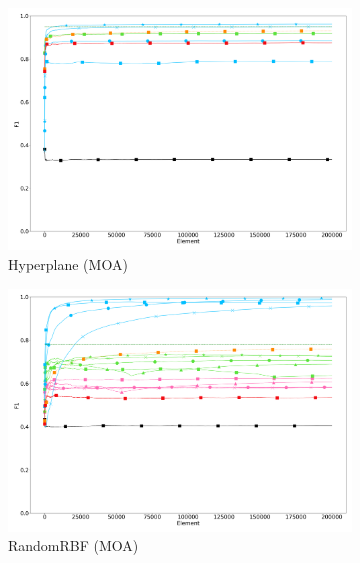 \begin{figure}
\begin{subfigure}[t]{.49\linewidth}
		\label{fig:f1-drift}
	\end{subfigure}\\
	\begin{subfigure}[t]{.49\linewidth}
		\includegraphics[width=\linewidth]{figures/results/dataset_1_f1.png}
		\caption{Hyperplane (MOA)}
		\label{fig:f1-dataset_1}
	\end{subfigure}
	\begin{subfigure}[t]{.49\linewidth}
		\includegraphics[width=\linewidth]{figures/results/dataset_2_f1.png}
		\caption{RandomRBF (MOA)}
		\label{fig:f1-dataset_2}
	\end{subfigure}\\
	\begin{subfigure}[t]{.49\linewidth}

\end{subfigure}
\end{figure}
